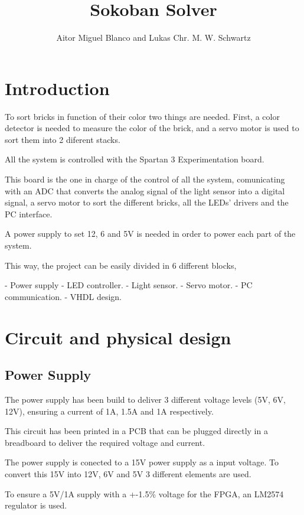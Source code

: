 \documentclass[12pt,a4paper]{article}
\begin{document}
\title{Sokoban Solver}
\author{Aitor Miguel Blanco and Lukas Chr. M. W. Schwartz}
\maketitle

\pagebreak


\section{Introduction}
To sort bricks in function of their color two things are needed. First, a color detector is needed to measure the color of the brick, and a servo motor is used to sort them into 2 diferent stacks.

All the system is controlled with the Spartan 3 Experimentation board.

This board is the one in charge of the control of all the system, comunicating with an ADC that converts the analog signal of the light sensor into a digital signal, a servo motor to sort the different bricks, all the LEDs' drivers and the PC interface.

A power supply to set 12, 6 and 5V is needed in order to power each part of the system.

This way, the project can be easily divided in 6 different blocks,

	- Power supply
	- LED controller.
	- Light sensor.
	- Servo motor.
	- PC communication.
	- VHDL design.
	

\section{Circuit and physical design}

\subsection{Power Supply}
The power supply has been build to deliver 3 different voltage levels (5V, 6V, 12V), ensuring a current of 1A, 1.5A and 1A respectively.

This circuit has been printed in a PCB that can be plugged directly in a breadboard to deliver the required voltage and current.

The power supply is conected to a 15V power supply as a input voltage. To convert this 15V into 12V, 6V and 5V 3 different elements are used.

To ensure a 5V/1A supply with a +-1.5\% voltage for the FPGA, an LM2574 regulator is used. 
\end{document}
